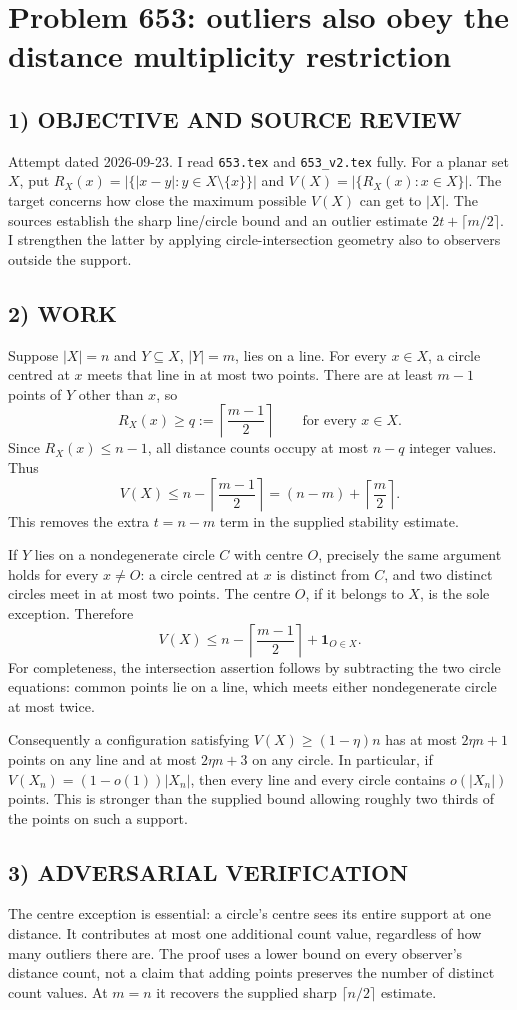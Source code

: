 \section{Problem 653: outliers also obey the distance multiplicity restriction}
\subsection*{1) OBJECTIVE AND SOURCE REVIEW}
Attempt dated 2026-09-23. I read \texttt{653.tex} and \texttt{653\_v2.tex} fully. For a planar set $X$, put $R_X(x)=|\{|x-y|:y\in X\setminus\{x\}\}|$ and $V(X)=|\{R_X(x):x\in X\}|$. The target concerns how close the maximum possible $V(X)$ can get to $|X|$. The sources establish the sharp line/circle bound and an outlier estimate $2t+\lceil m/2\rceil$. I strengthen the latter by applying circle-intersection geometry also to observers outside the support.
\subsection*{2) WORK}
Suppose $|X|=n$ and $Y\subseteq X$, $|Y|=m$, lies on a line. For every $x\in X$, a circle centred at $x$ meets that line in at most two points. There are at least $m-1$ points of $Y$ other than $x$, so
\[
R_X(x)\ge q:=\left\lceil\frac{m-1}{2}\right\rceil
\qquad\text{for every }x\in X.
\]
Since $R_X(x)\le n-1$, all distance counts occupy at most $n-q$ integer values. Thus
\[
V(X)\le n-\left\lceil\frac{m-1}{2}\right\rceil
=(n-m)+\left\lceil\frac m2\right\rceil.
\]
This removes the extra $t=n-m$ term in the supplied stability estimate.

If $Y$ lies on a nondegenerate circle $C$ with centre $O$, precisely the same argument holds for every $x\ne O$: a circle centred at $x$ is distinct from $C$, and two distinct circles meet in at most two points. The centre $O$, if it belongs to $X$, is the sole exception. Therefore
\[
V(X)\le n-\left\lceil\frac{m-1}{2}\right\rceil+\mathbf1_{O\in X}.
\]
For completeness, the intersection assertion follows by subtracting the two circle equations: common points lie on a line, which meets either nondegenerate circle at most twice.

Consequently a configuration satisfying $V(X)\ge(1-\eta)n$ has at most $2\eta n+1$ points on any line and at most $2\eta n+3$ on any circle. In particular, if $V(X_n)=(1-o(1))|X_n|$, then every line and every circle contains $o(|X_n|)$ points. This is stronger than the supplied bound allowing roughly two thirds of the points on such a support.
\subsection*{3) ADVERSARIAL VERIFICATION}
The centre exception is essential: a circle's centre sees its entire support at one distance. It contributes at most one additional count value, regardless of how many outliers there are. The proof uses a lower bound on every observer's distance count, not a claim that adding points preserves the number of distinct count values. At $m=n$ it recovers the supplied sharp $\lceil n/2\rceil$ estimate.
